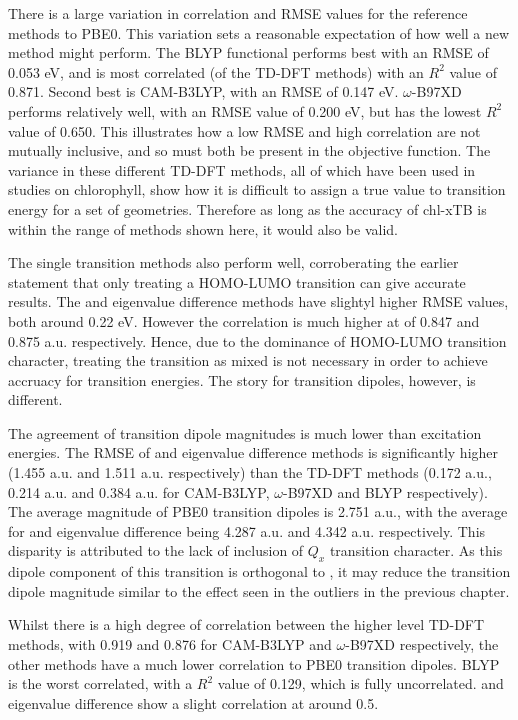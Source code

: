 There is a large variation in correlation and RMSE values for the reference methods
to PBE0. This variation sets a reasonable expectation of how well a new method
might perform.
The BLYP functional performs best with an RMSE of 0.053 eV, and is most correlated
(of the TD-DFT methods) with an $R^2$ value of 0.871. Second best is CAM-B3LYP,
with an RMSE of 0.147 eV. $\omega$-B97XD performs relatively well, with an RMSE
value of 0.200 eV, but has the lowest $R^2$ value of 0.650. This illustrates how
a low RMSE and high correlation are not mutually inclusive, and so must both be 
present in the objective function. 
The variance in these different TD-DFT methods, all of which have been used in studies
on chlorophyll, show how it is difficult to assign a true value to transition energy
for a set of geometries. Therefore as long as the accuracy of chl-xTB is within 
the range of methods shown here, it would also be valid.

The single transition methods also perform well, corroberating the earlier statement
that only treating a HOMO-LUMO transition can give accurate results. The \dscf and
eigenvalue difference methods have slightyl higher RMSE values, both around 0.22 eV.
However the correlation is much higher at of 0.847 and 0.875 a.u. respectively.
Hence, due to the dominance of HOMO-LUMO transition character, treating the transition
as mixed is not necessary in order to achieve accruacy for transition energies. 
The story for transition dipoles, however, is different.

The agreement of transition dipole magnitudes is much lower than excitation energies.
The RMSE of \dscf and eigenvalue difference methods is significantly higher (1.455
a.u. and 1.511 a.u. respectively) than the TD-DFT methods (0.172 a.u., 0.214 a.u.
and 0.384 a.u. for CAM-B3LYP, $\omega$-B97XD and BLYP respectively). The average
magnitude of PBE0 transition dipoles is 2.751 a.u., with the average for \dscf and 
eigenvalue difference being 4.287 a.u. and 4.342 a.u. respectively. This disparity
is attributed to the lack of inclusion of $Q_x$ transition character. As this dipole
component of this transition is orthogonal to \Qy, it may reduce the transition 
dipole magnitude similar to the effect seen in the outliers in the previous chapter.

Whilst there is a high degree of correlation between the higher level TD-DFT methods,
with 0.919 and 0.876 for CAM-B3LYP and $\omega$-B97XD respectively, the other methods
have a much lower correlation to PBE0 transition dipoles. BLYP is the worst correlated,
with a $R^2$ value of 0.129, which is fully uncorrelated. \dscf and eigenvalue difference
show a slight correlation at around 0.5.

